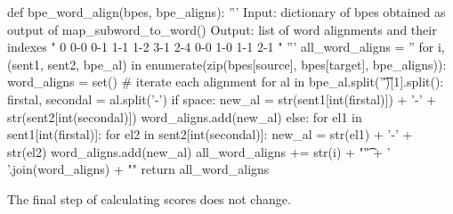 \begin{python}
def bpe_word_align(bpes, bpe_aligns):
  '''
  Input: dictionary of bpes obtained as output of map_subword_to_word()
  Output: list of word alignments and their indexes
    "
      0   0-0 0-1 1-1 1-2 3-1 2-4    0-0 1-0 1-1 2-1 \n
    "
  '''
  all_word_aligns = ''
  for i, (sent1, sent2, bpe_al) in enumerate(zip(bpes[source], bpes[target], bpe_aligns)):
    word_aligns = set()
    # iterate each alignment
    for al in bpe_al.split('\t')[1].split():
      firstal, secondal = al.split('-')
      if space:
        new_al = str(sent1[int(firstal)]) + '-' + str(sent2[int(secondal)])
        word_aligns.add(new_al)
      else:
        for el1 in sent1[int(firstal)]:
          for el2 in sent2[int(secondal)]:
            new_al = str(el1) + '-' + str(el2)
            word_aligns.add(new_al)
    all_word_aligns += str(i) + "\t" + ' '.join(word_aligns) + "\n"
  return all_word_aligns
\end{python}

The final step of calculating scores does not change.
